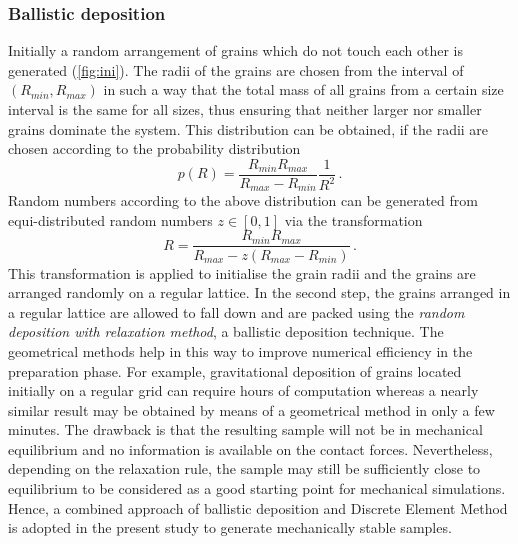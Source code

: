 \subsubsection{Ballistic deposition}
Initially a random arrangement of grains which do not touch each other is 
generated (\cref{fig:ini}). The radii of the grains are chosen from the 
interval of $(\mathit{R}_{\mathit{min}},\mathit{R}_{\mathit{max}})$ in such a 
way that the total mass of all grains from a certain size interval is the same 
for all sizes, thus ensuring that neither larger nor smaller grains dominate 
the system. This distribution can be obtained, if the radii are 
chosen according to the probability distribution
%
\begin{equation}
\mathit{p}(\mathit{R})=\frac{\mathit{R}_{\mathit{min}}\mathit{R}_{\mathit{max}}}{\mathit{R}_{\mathit{max}}
 - \mathit{R}_{\mathit{min}}} \frac{1}{\mathit{R}^{2}} \,.
\end{equation}
%
Random numbers according to the above distribution can be generated from 
equi-distributed random numbers $\mathit{z}\in [0,1]$ via the transformation
%
\begin{equation}
\mathit{R}=\frac{\mathit{R}_{\mathit{min}}\mathit{R}_{\mathit{max}}}{\mathit{R}_{\mathit{max}}
 - z(\mathit{R}_{\mathit{max}} - \mathit{R}_{\mathit{min}})}  \,.
\end{equation}
%
This transformation is applied to initialise the grain radii and the 
grains are arranged randomly on a regular lattice. In the second step, the 
grains arranged in a regular lattice are allowed to fall down and are 
packed using the \textit{random deposition with relaxation method}, a ballistic 
deposition technique. The geometrical methods help in this way to improve 
numerical efficiency in the preparation phase. For example, gravitational 
deposition of grains located initially on a regular grid can require hours of 
computation whereas a nearly similar result may be obtained by means of a 
geometrical method in only a few minutes. The drawback is that the resulting 
sample will not be in mechanical equilibrium and no information is available on 
the contact forces. Nevertheless, depending on the relaxation rule, the sample 
may still be sufficiently close to equilibrium to be considered as a good 
starting point for mechanical simulations. Hence, a combined approach of 
ballistic deposition and Discrete Element Method is adopted in the present 
study to generate mechanically stable samples. 

